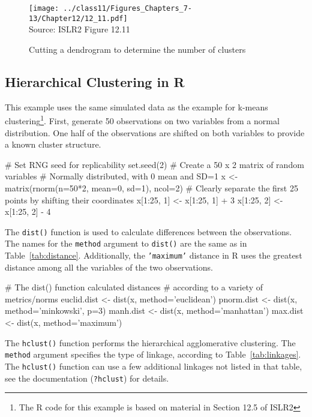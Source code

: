 \begin{figure}
\centering
\texttt{[image: ../class11/Figures\_Chapters\_7-13/Chapter12/12\_11.pdf]} \\

\scriptsize Source: ISLR2 Figure 12.11
\caption{Cutting a dendrogram to determine the number of clusters}
\label{fig:dendro3}
\end{figure}


\subsection{Hierarchical Clustering in R}

This example uses the same simulated data as the example for k-means clustering\footnote{The R code for this example is based on material in Section 12.5 of ISLR2}. First, generate 50 observations on two variables from a normal distribution. One half of the observations are shifted on both variables to provide a known cluster structure.

\begin{samepage}
\begin{Rcode}
# Set RNG seed for replicability
set.seed(2)
# Create a 50 x 2 matrix of random variables 
# Normally distributed, with 0 mean and SD=1
x <- matrix(rnorm(n=50*2, mean=0, sd=1), ncol=2)
# Clearly separate the first 25 points by shifting their coordinates
x[1:25, 1] <- x[1:25, 1] + 3
x[1:25, 2] <- x[1:25, 2] - 4
\end{Rcode}
\end{samepage}

The \texttt{dist()} function is used to calculate differences between the observations. The names for the \texttt{method} argument to \texttt{dist()} are the same as in Table~\ref{tab:distance}. Additionally, the \texttt{'maximum'} distance in R uses the greatest distance among all the variables of the two observations. 

\begin{samepage}
\begin{Rcode}
# The dist() function calculated distances
# according to a variety of metrics/norms
euclid.dist <- dist(x, method='euclidean')
pnorm.dist <- dist(x, method='minkowski', p=3)
manh.dist <- dist(x, method='manhattan')
max.dist <- dist(x, method='maximum')
\end{Rcode}
\end{samepage}

The \texttt{hclust()} function performs the hierarchical agglomerative clustering. The \texttt{method} argument specifies the type of linkage, according to Table~\ref{tab:linkages}. The \texttt{hclust()} function can use a few additional linkages not listed in that table, see the documentation (\texttt{?hclust}) for details. 

